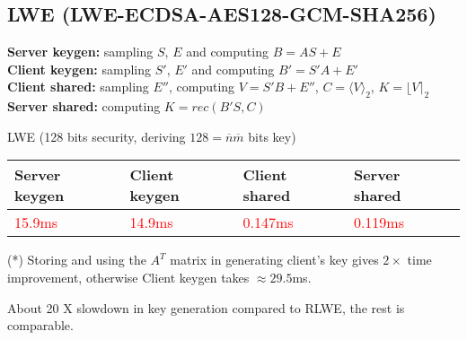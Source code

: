 \documentclass[12pt]{article}
\newcommand{\nbar}{\overline{n}}
\newcommand{\mbar}{\overline{m}}
\begin{document}
\subsection{LWE \tiny{(LWE-ECDSA-AES128-GCM-SHA256)}}

\footnotesize{\textbf{Server keygen:} sampling $S$, $E$ and computing $B = AS + E$\\
\textbf{Client keygen:} sampling $S'$, $E'$ and computing $B' = S'A + E'$\\
\textbf{Client shared:} sampling $E''$, computing $V = S'B + E''$, $C = \langle V \rangle_2$, $K = \lfloor V \rceil_2$\\
\textbf{Server shared:} computing $K = rec(B'S, C)$\\}
\normalsize

LWE (128 bits security, deriving $128 = \nbar \mbar$ bits key)
\begin{center}
    \begin{tabular}{| l | l | l | l |}
    \hline
    Server keygen & Client keygen & Client shared & Server shared \\ \hline
    \textcolor{red}{15.9ms} &   \textcolor{red}{14.9ms} &   \textcolor{red}{0.147ms} &   \textcolor{red}{0.119ms} \\ \hline
    \end{tabular}
\end{center}

\footnotesize (*) Storing and using the $A^T$ matrix in generating client's key gives $2\times$ time improvement, otherwise Client keygen takes $\approx 29.5$ms.
\normalsize

About 20 X slowdown in key generation compared to RLWE, the rest is comparable.

\end{document}

